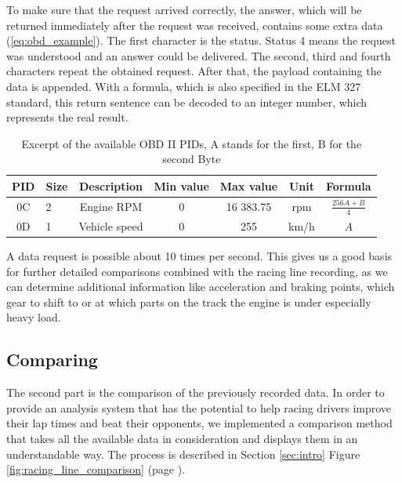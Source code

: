 To make sure that the request arrived correctly, the answer, which will be returned immediately after the request was received, contains some extra data (\ref{eq:obd_example}). The first character is the status. Status 4 means the request was understood and an answer could be delivered. The second, third and fourth characters repeat the obtained request. After that, the payload containing the data is appended. With a formula, which is also specified in the ELM 327 standard, this return sentence can be decoded to an integer number, which represents the real result.

\begin{table}[!ht]
	\begin{center}
		\begin{tabularx}{\textwidth}{|c | X | c | c | c | c | c |}
			\hline
			PID & Size & Description & Min value & Max value & Unit & Formula\\ \hline
			0C & 2 & Engine RPM & 0 & 16 383.75 & rpm & $\frac{256A + B}{4}$\\ \hline
			0D & 1 & Vehicle speed & 0 & 255 & km/h & $A$\\ \hline
		\end{tabularx}
	\end{center}
	\caption{Excerpt of the available OBD II PIDs, A stands for the first, B for the second Byte}
\end{table}

A data request is possible about 10 times per second. This gives us a good basis for further detailed comparisons combined with the racing line recording, as we can determine additional information like acceleration and braking points, which gear to shift to or at which parts on the track the engine is under especially heavy load.

\subsection{Comparing}
\label{sec:comparing}
The second part is the comparison of the previously recorded data. In order to provide an analysis system that has the potential to help racing drivers improve their lap times and beat their opponents, we implemented a comparison method that takes all the available data in consideration and displays them in an understandable way. The process is described in Section \ref{sec:intro} Figure \ref{fig:racing_line_comparison} (page \pageref{fig:racing_line_comparison}).

